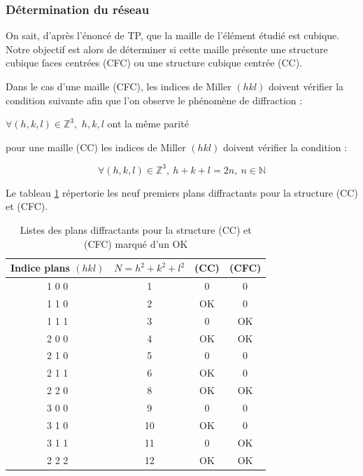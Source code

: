 \subsubsection{Détermination du réseau}


	On sait, d'après l'énoncé de  TP, que la maille de l'élément étudié est cubique. Notre objectif est alors de déterminer si cette maille présente une structure cubique faces centrées (CFC) ou une structure cubique centrée (CC).
	
	
	Dans le cas d’une maille (CFC), les indices de Miller $(h k l)$ doivent vérifier la condition
	suivante afin que l’on observe le phénomène de diffraction : 
	\begin{center} 
		$\forall (h,k,l)\in \mathbb{Z}^3,$  $h,k,l$ ont la même parité 
	\end{center}
	
	pour une  maille (CC) les indices de Miller $(h k l)$ doivent vérifier la condition : 
	
	\begin{equation}
		\forall (h,k,l)\in \mathbb{Z}^3, \ 	h + k + l = 2n, \ n \in \mathbb{N}
	\end{equation}


\newpage
Le tableau \ref{tab:Listes des plans diffractants pour la structure (CC) et (CFC) marqué d’un "OK"} répertorie les neuf premiers plans diffractants pour la structure (CC) et (CFC).
\begin{table}[h!]
	\centering
	\begin{tabular}{|c|c|c|c|}
		\hline
		\textbf{Indice plans $(h k l)$} & \textbf{$N=h^2+k^2+l^2$} & \textbf{(CC)} & \textbf{(CFC)} \\
		\hline
		1 0 0 & 1 & 0 & 0 \\
		\hline
		1 1 0 & 2 & \textcolor{myred}{OK }& 0 \\
		\hline
		1 1 1 & 3 & 0 & \textcolor{myred}{OK } \\
		\hline
		2 0 0 & 4 & \textcolor{myred}{OK } & \textcolor{myred}{OK } \\
		\hline
		2 1 0 & 5 & 0 & 0 \\
		\hline
		2 1 1 & 6 & \textcolor{myred}{OK } & 0 \\
		\hline
		2 2 0 & 8 & \textcolor{myred}{OK } & \textcolor{myred}{OK } \\
		\hline
		3 0 0 & 9 & 0 & 0 \\
		\hline
		3 1 0 & 10 & \textcolor{myred}{OK } & 0 \\
		\hline
				3 1 1 & 11 & 0 & \textcolor{myred}{OK } \\
		\hline
				2 2 2 & 12 & \textcolor{myred}{OK } & \textcolor{myred}{OK } \\
		\hline

	\end{tabular}
	\caption{Listes des plans diffractants pour la structure (CC) et (CFC) marqué d’un \textcolor{myred}{OK}}
	\label{tab:Listes des plans diffractants pour la structure (CC) et (CFC) marqué d’un "OK"}
\end{table}

